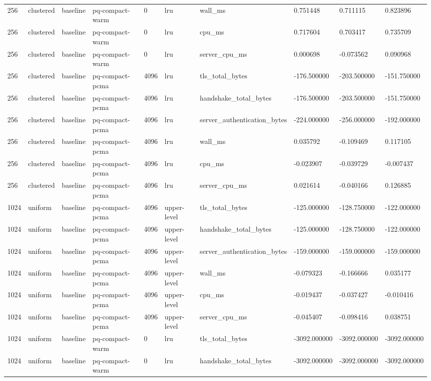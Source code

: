 \begin{tabular}{llllllllll}
256 & clustered & baseline & pq-compact-warm & 0 & lru & wall\_ms & 0.751448 & 0.711115 & 0.823896 \\
256 & clustered & baseline & pq-compact-warm & 0 & lru & cpu\_ms & 0.717604 & 0.703417 & 0.735709 \\
256 & clustered & baseline & pq-compact-warm & 0 & lru & server\_cpu\_ms & 0.000698 & -0.073562 & 0.090968 \\
256 & clustered & baseline & pq-compact-pcma & 4096 & lru & tls\_total\_bytes & -176.500000 & -203.500000 & -151.750000 \\
256 & clustered & baseline & pq-compact-pcma & 4096 & lru & handshake\_total\_bytes & -176.500000 & -203.500000 & -151.750000 \\
256 & clustered & baseline & pq-compact-pcma & 4096 & lru & server\_authentication\_bytes & -224.000000 & -256.000000 & -192.000000 \\
256 & clustered & baseline & pq-compact-pcma & 4096 & lru & wall\_ms & 0.035792 & -0.109469 & 0.117105 \\
256 & clustered & baseline & pq-compact-pcma & 4096 & lru & cpu\_ms & -0.023907 & -0.039729 & -0.007437 \\
256 & clustered & baseline & pq-compact-pcma & 4096 & lru & server\_cpu\_ms & 0.021614 & -0.040166 & 0.126885 \\
1024 & uniform & baseline & pq-compact-pcma & 4096 & upper-level & tls\_total\_bytes & -125.000000 & -128.750000 & -122.000000 \\
1024 & uniform & baseline & pq-compact-pcma & 4096 & upper-level & handshake\_total\_bytes & -125.000000 & -128.750000 & -122.000000 \\
1024 & uniform & baseline & pq-compact-pcma & 4096 & upper-level & server\_authentication\_bytes & -159.000000 & -159.000000 & -159.000000 \\
1024 & uniform & baseline & pq-compact-pcma & 4096 & upper-level & wall\_ms & -0.079323 & -0.166666 & 0.035177 \\
1024 & uniform & baseline & pq-compact-pcma & 4096 & upper-level & cpu\_ms & -0.019437 & -0.037427 & -0.010416 \\
1024 & uniform & baseline & pq-compact-pcma & 4096 & upper-level & server\_cpu\_ms & -0.045407 & -0.098416 & 0.038751 \\
1024 & uniform & baseline & pq-compact-warm & 0 & lru & tls\_total\_bytes & -3092.000000 & -3092.000000 & -3092.000000 \\
1024 & uniform & baseline & pq-compact-warm & 0 & lru & handshake\_total\_bytes & -3092.000000 & -3092.000000 & -3092.000000 \\

\end{tabular}
